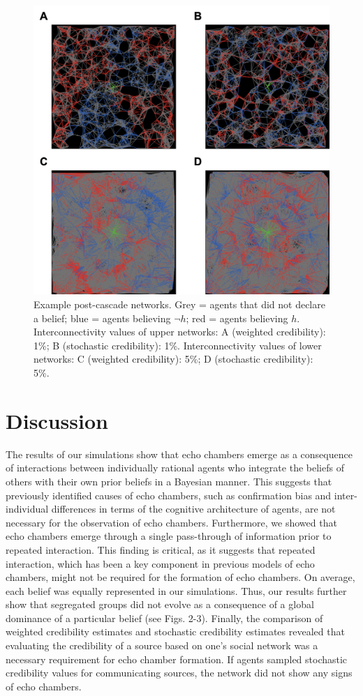 \documentclass[doc,floatsintext]{apa6}
\begin{document}
\begin{figure}[!t]
\centering
\includegraphics[width=1\columnwidth]{img/example_networks.png}
\caption{Example post-cascade networks. Grey = agents that did not declare a belief; blue = agents believing \(\neg h\); red = agents believing \(h\). Interconnectivity values of upper networks: A (weighted credibility): 1\%; B (stochastic credibility): 1\%. Interconnectivity values of lower networks: C (weighted credibility): 5\%; D (stochastic credibility): 5\%.} 
\label{fig:rich_vis}
\end{figure}


\section{Discussion}
The results of our simulations show that echo chambers emerge as a consequence of interactions between individually rational agents who integrate the beliefs of others with their own prior beliefs in a Bayesian manner. This suggests that previously identified causes of echo chambers, such as confirmation bias and inter-individual differences in terms of the cognitive architecture of agents, are not necessary for the observation of echo chambers. Furthermore, we showed that echo chambers emerge through a single pass-through of information prior to repeated interaction. This finding is critical, as it suggests that repeated interaction, which has been a key component in previous models of echo chambers, might not be required for the formation of echo chambers. On average, each belief was equally represented in our simulations. Thus, our results further show that segregated groups did not evolve as a consequence of a global dominance of a particular belief (see Figs. 2-3). Finally, the comparison of weighted credibility estimates and stochastic credibility estimates revealed that evaluating the credibility of a source based on one's social network was a necessary requirement for echo chamber formation. If agents sampled stochastic credibility values for communicating sources, the network did not show any signs of echo chambers. 
\end{document}
